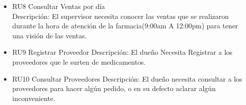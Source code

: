 \begin{itemize}
\item RU8 Consultar Ventas por día\\
Descripción: El supervisor necesita conocer las ventas que se realizaron durante la hora de atención de la farmacia(9:00am A 12:00pm) para tener una visión de las ventas.\\

\item RU9 Registrar Proveedor
Descripción: El dueño Necesita Registrar a los proveedores que le surten de medicamentos.\\

\item RU10 Consultar Proveedores
Descripción: El dueño necesita consultar a los proveedores para hacer algún pedido,
o en su defecto aclarar algún inconveniente.

\end{itemize}

